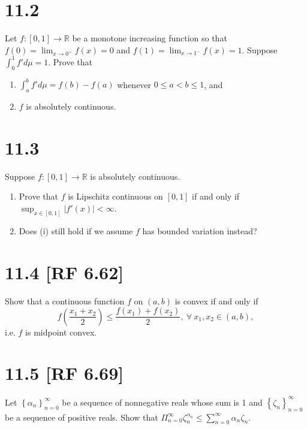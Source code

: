 \documentclass[12pt]{article}
\begin{document}
\section*{11.2}
Let $f : [0,1] \rightarrow \mathbb{R}$ be a monotone increasing function so that $f(0) = \lim_{x \rightarrow 0^{+}}f(x) = 0$ and $f(1) =
\lim_{x\rightarrow 1^{-}}f(x) = 1$. Suppose $\int_{0}^{1}f'd\mu = 1$. Prove that 
\begin{enumerate}[label=(\alph*)]
\item $\int_{a}^{b}f' d\mu = f(b) - f(a)$ whenever $0 \leq a < b \leq 1$, and 
\item $f$ is absolutely continuous.
\end{enumerate}


\section*{11.3}
Suppose $f : [0,1] \rightarrow \mathbb{R}$ is absolutely continuous.
\begin{enumerate}[label=(\roman*)]
\item Prove that $f$ is Lipschitz continuous on $[0,1]$ if and only if $\sup_{x \in [0,1]}|f'(x)| < \infty$.
\item Does (i) still hold if we assume $f$ has bounded variation instead?
\end{enumerate}



\section*{11.4 [RF 6.62]}
Show that a continuous function $f$ on $(a,b)$ is convex if and only if 
\[ f\left( \frac{x_{1} + x_{2}}{2} \right) \leq \frac{f(x_{1}) + f(x_{2})}{2}, \ \forall \ x_{1}, x_{2} \in (a,b), \]
i.e. $f$ is midpoint convex.

\section*{11.5 [RF 6.69]}
Let $\left\{ \alpha_{n} \right\}_{n=0}^{\infty}$ be a sequence of nonnegative reals whose sum is 1 and $\left\{ \zeta_{n} \right\}_{n=0}^{\infty}$ be
a sequence of positive reals. Show that $\Pi_{n=0}^{\infty}\zeta_{n}^{\alpha_{n}} \leq \sum_{n=0}^{\infty}\alpha_{n}\zeta_{n}$.
\end{document}
